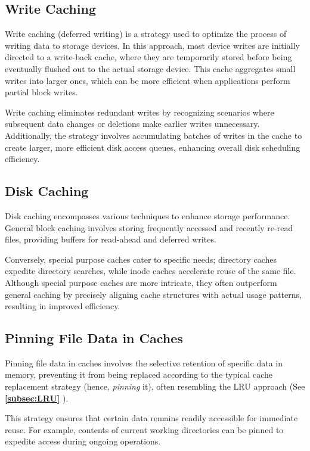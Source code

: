 \documentclass{report}
\newcommand{\refto}[2]{\textbf{\ref{#1:#2} \nameref{#1:#2}}}
\begin{document}
\subsection{Write Caching}
\label{subsec:WC}
Write caching (deferred writing) is a strategy used to optimize the process of writing data to
storage devices. In this approach, most device writes are initially directed to a write-back cache,
where they are temporarily stored before being eventually flushed out to the actual storage
device. This cache aggregates small writes into larger ones, which can be more efficient when
applications perform partial block writes.

Write caching eliminates redundant writes by recognizing scenarios where subsequent data changes or
deletions make earlier writes unnecessary. Additionally, the strategy involves accumulating batches
of writes in the cache to create larger, more efficient disk access queues, enhancing overall disk
scheduling efficiency.


\subsection{Disk Caching}
Disk caching encompasses various techniques to enhance storage performance. General block caching
involves storing frequently accessed and recently re-read files, providing buffers for read-ahead
and deferred writes.

Conversely, special purpose caches cater to specific needs; directory caches expedite directory
searches, while inode caches accelerate reuse of the same file. Although special purpose caches are
more intricate, they often outperform general caching by precisely aligning cache structures with
actual usage patterns, resulting in improved efficiency.


\subsection{Pinning File Data in Caches}
Pinning file data in caches involves the selective retention of specific data in memory, preventing
it from being replaced according to the typical cache replacement strategy (hence, \textit{pinning}
it), often resembling the LRU approach (See \refto{subsec}{LRU}).

This strategy ensures that certain data remains readily accessible for immediate reuse. For example,
contents of current working directories can be pinned to expedite access during ongoing operations.
\end{document}
